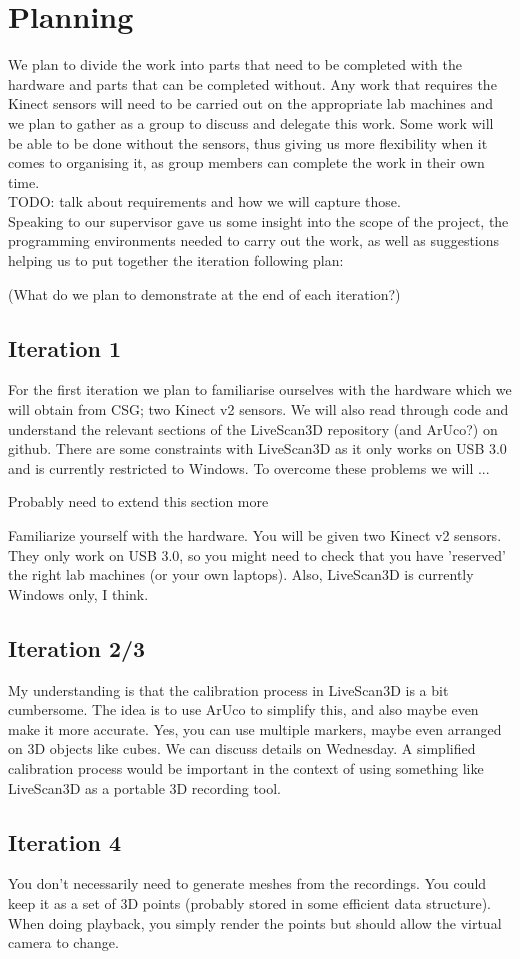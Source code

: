 \documentclass[a4paper,12pt]{article}
\begin{document}
\section*{Planning}
We plan to divide the work into parts that need to be completed with the hardware and parts that can be completed without. Any work that requires the Kinect sensors will need to be carried out on the appropriate lab machines and we plan to gather as a group to discuss and delegate this work. Some work will be able to be done without the sensors, thus giving us more flexibility when it comes to organising it, as group members can complete the work in their own time. \\

TODO: talk about requirements and how we will capture those. \\
Speaking to our supervisor gave us some insight into the scope of the project, the programming environments needed to carry out the work, as well as suggestions helping us to put together the iteration following plan:


(What do we plan to demonstrate at the end of each iteration?)

\subsection*{Iteration 1}
For the first iteration we plan to familiarise ourselves with the hardware which we will obtain from CSG; two Kinect v2 sensors. We will also read through code and understand the relevant sections of the LiveScan3D repository (and ArUco?) on github. There are some constraints with LiveScan3D as it only works on USB 3.0 and is currently restricted to Windows. To overcome these problems we will ...

Probably need to extend this section more

Familiarize yourself with the hardware. You will be given two Kinect v2 sensors. They only work on USB 3.0, so you might need to check that you have 'reserved' the right lab machines (or your own laptops). Also, LiveScan3D is currently Windows only, I think.

\subsection*{Iteration 2/3}
My understanding is that the calibration process in LiveScan3D is a bit cumbersome. The idea is to use ArUco to simplify this, and also maybe even make it more accurate. Yes, you can use multiple markers, maybe even arranged on 3D objects like cubes. We can discuss details on Wednesday. A simplified calibration process would be important in the context of using something like LiveScan3D as a portable 3D recording tool.

\subsection*{Iteration 4}
You don't necessarily need to generate meshes from the recordings. You could keep it as a set of 3D points (probably stored in some efficient data structure). When doing playback, you simply render the points but should allow the virtual camera to change.
\end{document}
